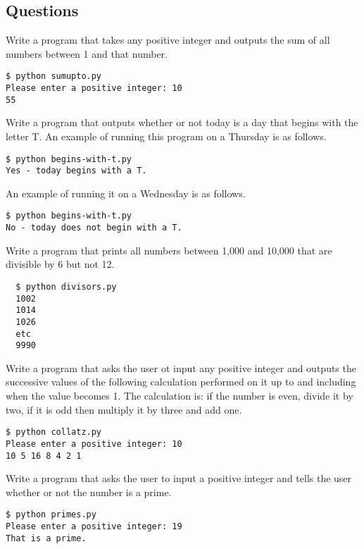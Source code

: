 \documentclass[a4paper, 12pt]{exam}
\begin{document}
  
  


\subsection*{Questions}
  
  \begin{questions}

    \question
    Write a program that takes any positive integer and outputs the sum of all numbers between 1 and that number.
    \begin{verbatim}
$ python sumupto.py
Please enter a positive integer: 10
55
    \end{verbatim}

    \question
      Write a program that outputs whether or not today is a day that begins with the letter T.
      An example of running this program on a Thursday is as follows.
    \begin{verbatim}
$ python begins-with-t.py
Yes - today begins with a T.
    \end{verbatim}
      An example of running it on a Wednesday is as follows.
      \begin{verbatim}
$ python begins-with-t.py
No - today does not begin with a T.
      \end{verbatim}


      \question
      Write a program that prints all numbers between 1,000 and 10,000 that are divisible by 6 but not 12.
      \begin{verbatim}
  $ python divisors.py
  1002
  1014
  1026
  etc
  9990
      \end{verbatim}

    \question
      Write a program that asks the user ot input any positive integer and outputs the successive values of the following calculation performed on it up to and including when the value becomes 1.
      The calculation is: if the number is even, divide it by two, if it is odd then multiply it by three and add one.
      \begin{verbatim}
$ python collatz.py
Please enter a positive integer: 10
10 5 16 8 4 2 1
      \end{verbatim}


    \question
    Write a program that asks the user to input a positive integer and tells the user whether or not the number is a prime.
    \begin{verbatim}
$ python primes.py
Please enter a positive integer: 19
That is a prime.
    \end{verbatim}
    

\end{questions}
\end{document}
